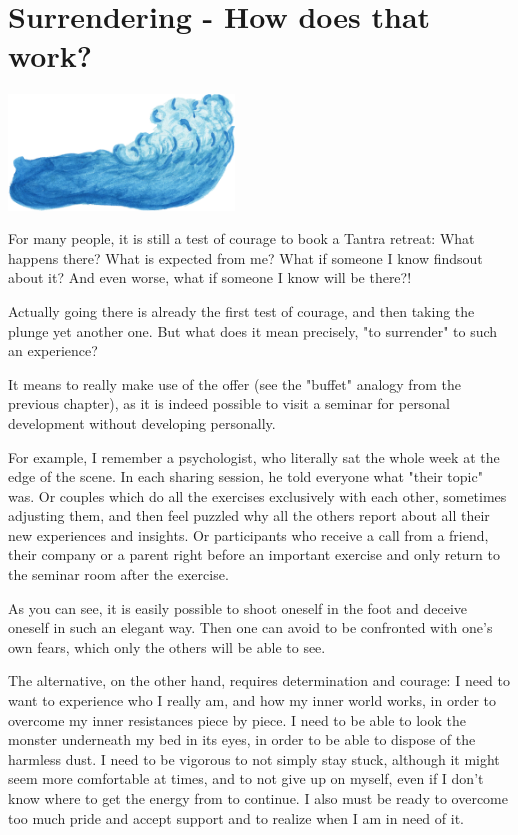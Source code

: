 \section{Surrendering - How does that work?}

\begin{center}
\includegraphics[width=6cm]{images/03_surrender.png}
\end{center}

For many people, it is still a test of courage to book a Tantra retreat: What happens there? What is expected from me? What if someone I know findsout about it? And even worse, what if someone I know will be there?!

Actually going there is already the first test of courage, and then taking the plunge yet another one. But what does it mean precisely, "to surrender" to such an experience?

It means to really make use of the offer (see the "buffet" analogy from the previous chapter), as it is indeed possible to visit a seminar for personal development without developing personally.

For example, I remember a psychologist, who literally sat the whole week at the edge of the scene. In each sharing session, he told everyone what "their topic" was. Or couples which do all the exercises exclusively with each other, sometimes adjusting them, and then feel puzzled why all the others report about all their new experiences and insights. Or participants who receive a call from a friend, their company or a parent right before an important exercise and only return to the seminar room after the exercise.

As you can see, it is easily possible to shoot oneself in the foot and deceive oneself in such an elegant way. Then one can avoid to be confronted with one's own fears, which only the others will be able to see.

The alternative, on the other hand, requires determination and courage: I need to want to experience who I really am, and how my inner world works, in order to overcome my inner resistances piece by piece. I need to be able to look the monster underneath my bed in its eyes, in order to be able to dispose of the harmless dust. I need to be vigorous to not simply stay stuck, although it might seem more comfortable at times, and to not give up on myself, even if I don’t know where to get the energy from to continue. I also must be ready to overcome too much pride and accept support and to realize when I am in need of it.

